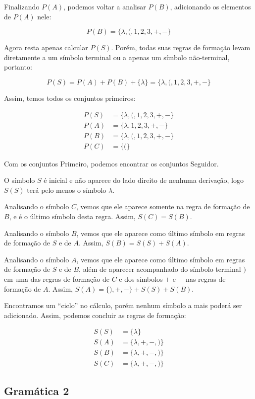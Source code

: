\documentclass{article}
\begin{document}
Finalizando $P(A)$, podemos voltar a analisar $P(B)$, adicionando os elementos de $P(A)$ nele:

$$P(B) = \{\lambda, (, 1, 2, 3, +, -\}$$

Agora resta apenas calcular $P(S)$. Porém, todas suas regras de formação levam diretamente a um símbolo terminal ou a apenas um símbolo não-terminal, portanto:

$$P(S) = P(A) + P(B) + \{\lambda\} = \{\lambda, (, 1, 2, 3, +, -\}$$

Assim, temos todos os conjuntos primeiros:

\begin{align*}
    P(S) &= \{\lambda, (, 1, 2, 3, +, -\}\\
    P(A) &= \{\lambda, 1, 2, 3, +, -\}\\
    P(B) &= \{\lambda, (, 1, 2, 3, +, -\}\\
    P(C) &= \{(\}
\end{align*}

Com os conjuntos Primeiro, podemos encontrar os conjuntos Seguidor.

O símbolo $S$ é inicial e não aparece do lado direito de nenhuma derivação, logo $S(S)$ terá pelo menos o símbolo $\lambda$.

Analisando o símbolo $C$, vemos que ele aparece somente na regra de formação de $B$, e é o último símbolo desta regra. Assim, $S(C) = S(B)$.

Analisando o símbolo $B$, vemos que ele aparece como último símbolo em regras de formação de $S$ e de $A$. Assim, $S(B) = S(S) + S(A)$.

Analisando o símbolo $A$, vemos que ele aparece como último símbolo em regras de formação de $S$ e de $B$, além de aparecer acompanhado do símbolo terminal $)$ em uma das regras de formação de $C$ e dos símbolos $+$ e $-$ nas regras de formação de $A$. Assim, $S(A) = \{), +, -\} + S(S) + S(B)$.

Encontramos um ``ciclo'' no cálculo, porém nenhum símbolo a mais poderá ser adicionado. Assim, podemos concluir as regras de formação:

\begin{align*}
    S(S) &= \{\lambda\}\\
    S(A) &= \{\lambda, +, -, )\}\\
    S(B) &= \{\lambda, +, -, )\}\\
    S(C) &= \{\lambda, +, -, )\}
\end{align*}

\subsection{Gramática 2}
\end{document}
